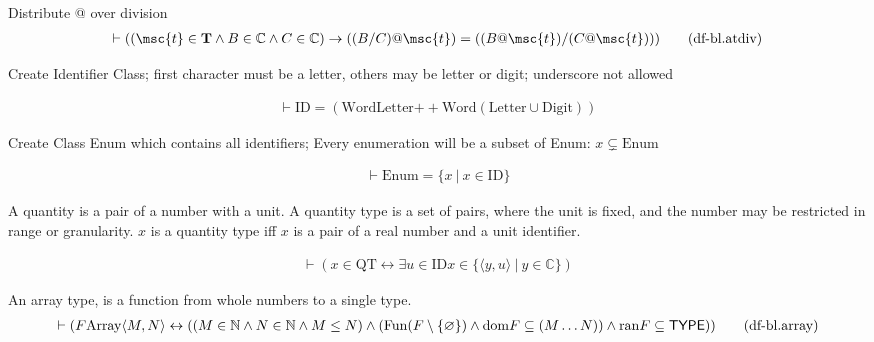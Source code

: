 \begin{metadefinition} Distribute @ over division
\begin{align}
\vdash ( ( \msc{t} \in \mathbf{T} \wedge B \in \mathbb{C} \wedge C \in \mathbb{C} ) \rightarrow ( ( B / C ) @ \msc{t} ) = ( ( B @ \msc{t} ) / ( C @ \msc{t} ) ) )\label{eq:df-bl.atdiv}\tag{df-bl.atdiv}
\end{align}
\end{metadefinition}


\begin{metadefinition} Create Identifier Class; first character must be a letter,
others may be letter or digit; underscore not allowed

\begin{align}
\vdash \mathrm{ID} = ( \mathrm{Word } \mathrm{Letter} \mathrm{ ++ } \mathrm{Word } ( \mathrm{Letter} \cup \mathrm{Digit} ) )\label{eq:df-bl.id}\tag{df-bl.id}
\end{align}
\end{metadefinition}


\begin{metadefinition} Create Class Enum which contains all identifiers;
Every enumeration will be a subset of Enum: $x \subsetneq \mathrm{Enum}$

\begin{align}
\vdash \mathrm{Enum} = \{ x ~\vert~ x \in \mathrm{ID} \}\label{eq:df-bl.enum}\tag{df-bl.enum}
\end{align}
\end{metadefinition}


\begin{metadefinition} A quantity is a pair of a number with a unit.  A quantity type is a set of
pairs, where the unit is fixed, and the number may be restricted in range or granularity.
$x$ is a quantity type iff $x$ is a pair of a real number and a unit identifier.

\begin{align}
\vdash ( x \in \mathrm{QT} \leftrightarrow \exists u \in \mathrm{ID} x \in \{ \langle y , u \rangle ~\vert~ y \in \mathbb{C} \} )\label{eq:df-bl.qt}\tag{df-bl.qt}
\end{align}
\end{metadefinition}


\begin{metadefinition} An array type, is a function from whole numbers to a single type.
\begin{align}
\vdash ( F \mathrm{Array} \langle M , N \rangle \leftrightarrow ( ( M \in \mathbb{N} \wedge N \in \mathbb{N} \wedge M \le N ) \wedge ( {\rm Fun} ( F \setminus \{ \varnothing \} ) \wedge {\rm dom} F
    \subseteq ( M \ldots N ) ) \wedge {\rm ran} F \subseteq \mathsf{TYPE} ) )\label{eq:df-bl.array}\tag{df-bl.array}
\end{align}
\end{metadefinition}


